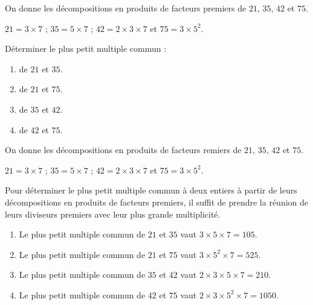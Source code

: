 \begin{exercice*}
    On donne les décompositions en produits de facteurs premiers de $21$, $35$, $42$ et $75$.

    $21=3\times 7$ ; $35=5\times 7$ ; $42=2\times 3\times 7$ et $75=3\times 5^2$.

    Déterminer le plus petit multiple commun :
    \begin{enumerate}
        \item de $21$ et $35$.
        \item de $21$ et $75$.
        \item de $35$ et $42$.
        \item de $42$ et $75$.
    \end{enumerate}    
\end{exercice*}
\begin{corrige}
    On donne les décompositions en produits de facteurs remiers de $21$, $35$, $42$ et $75$.

    $21=3\times 7$ ; $35=5\times 7$ ; $42=2\times 3\times 7$ et $75=3\times 5^2$.

    Pour déterminer le plus petit multiple commun à deux entiers à partir de leurs décompositions en produits de facteurs premiers,
    il suffit de prendre la réunion de leurs diviseurs premiers avec leur plus grande multiplicité.

    \begin{enumerate}
        \item Le plus petit multiple commun de $21$ et $35$ vaut $3\times 5\times 7 = 105$.
        \item Le plus petit multiple commun de $21$ et $75$ vaut $3\times 5^2\times 7 = 525$.
        \item Le plus petit multiple commun de $35$ et $42$ vaut $2\times 3\times 5\times 7 = 210$.
        \item Le plus petit multiple commun de $42$ et $75$ vaut $2\times 3\times 5^2\times 7 = \num{1050}$.
    \end{enumerate}    
\end{corrige}

